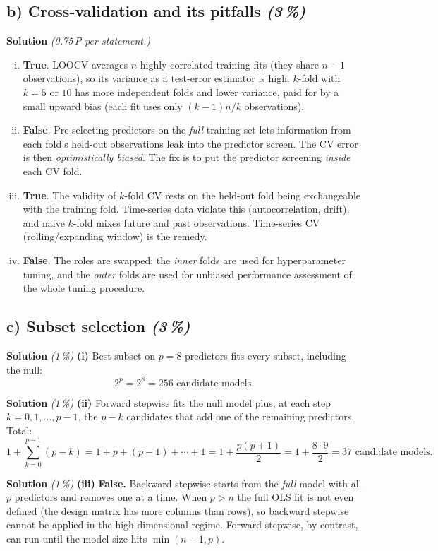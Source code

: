 \documentclass[11pt,a4paper]{article}
\newcommand{\subpoints}[1]{\textit{(#1\,\%)}}
\newcommand{\sol}{\noindent\textbf{Solution}}
\begin{document}
\subsection*{b) Cross-validation and its pitfalls \subpoints{3}}
\sol{} \emph{(0.75\,P per statement.)}
\begin{enumerate}[(i)]
  \item \textbf{True}. LOOCV averages $n$ highly-correlated training fits (they share $n-1$ observations), so
        its variance as a test-error estimator is high. $k$-fold with $k=5$ or $10$ has more independent folds
        and lower variance, paid for by a small upward bias (each fit uses only $(k-1)n/k$ observations).
  \item \textbf{False}. Pre-selecting predictors on the \emph{full} training set lets information from each
        fold's held-out observations leak into the predictor screen. The CV error is then \emph{optimistically
        biased}. The fix is to put the predictor screening \emph{inside} each CV fold.
  \item \textbf{True}. The validity of $k$-fold CV rests on the held-out fold being exchangeable with the
        training fold. Time-series data violate this (autocorrelation, drift), and naive $k$-fold mixes future
        and past observations. Time-series CV (rolling/expanding window) is the remedy.
  \item \textbf{False}. The roles are swapped: the \emph{inner} folds are used for hyperparameter tuning, and
        the \emph{outer} folds are used for unbiased performance assessment of the whole tuning procedure.
\end{enumerate}

\subsection*{c) Subset selection \subpoints{3}}

\sol{} \subpoints{1} \textbf{(i)} Best-subset on $p=8$ predictors fits every subset, including the null:
$$2^p = 2^8 = \boxed{256} \text{ candidate models.}$$

\medskip
\sol{} \subpoints{1} \textbf{(ii)} Forward stepwise fits the null model plus, at each step
$k=0,1,\dots,p-1$, the $p-k$ candidates that add one of the remaining predictors. Total:
$$1 + \sum_{k=0}^{p-1}(p-k) = 1 + p + (p-1) + \cdots + 1 = 1 + \frac{p(p+1)}{2}
   = 1 + \frac{8\cdot 9}{2} = \boxed{37} \text{ candidate models.}$$

\medskip
\sol{} \subpoints{1} \textbf{(iii)} \textbf{False.} Backward stepwise starts from the \emph{full} model with all
$p$ predictors and removes one at a time. When $p>n$ the full OLS fit is not even defined (the design matrix
has more columns than rows), so backward stepwise cannot be applied in the high-dimensional regime. Forward
stepwise, by contrast, can run until the model size hits $\min(n-1,p)$.
\end{document}
